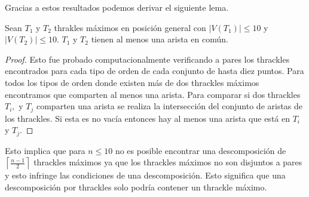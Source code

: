 Gracias a estos resultados podemos derivar el siguiente lema.
\begin{lemma}\label{lema:thdisjuntos}
  Sean $T_1$ y $T_2$ thrakles máximos en posición general con $|V(T_1)|\leq 10$
  y $|V(T_2)|\leq 10$. $T_1$ y $T_2$ tienen al menos una arista en común.
\end{lemma}
\begin{proof}
  Esto fue probado computacionalmente verificando a pares los thrackles
  encontrados para cada tipo de orden de cada conjunto de hasta diez puntos.
  Para todos los tipos de orden donde existen más de dos thrackles
  máximos encontramos que comparten al menos una arista. Para comparar
  si dos thrackles $T_i,$ y $T_j$ comparten una arista se realiza la intersección
  del conjunto de aristas de los thrackles. Si esta es no vacía entonces hay al menos una arista
  que está en $T_i$ y $T_j$.
\end{proof}
Esto implica que para $n\leq 10$ no es posible encontrar una descomposición
de $\left\lceil\frac{n-1}{2}\right\rceil$ thrackles máximos ya que los thrackles
máximos no son disjuntos a pares y esto infringe las condiciones de una descomposición.
Esto significa que una descomposición por thrackles solo podría contener un thrackle máximo.

